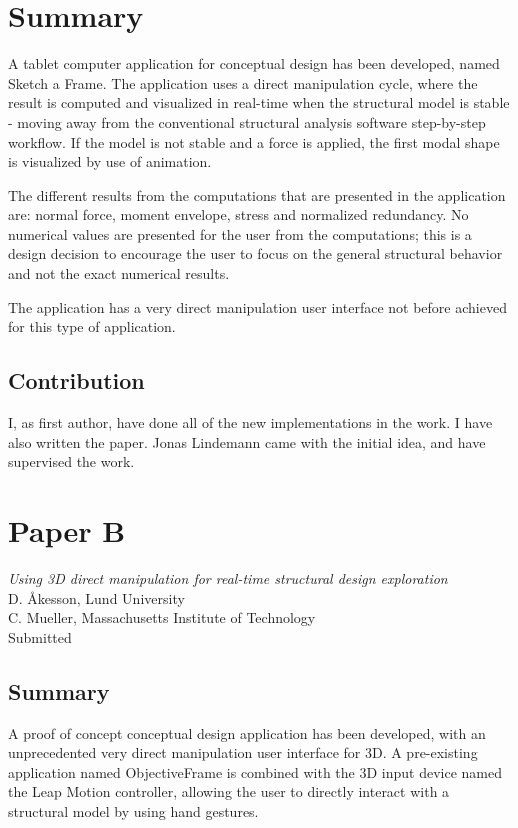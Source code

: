 \section*{Summary}

A tablet computer application for conceptual design has been developed, named Sketch a Frame. The application uses a direct manipulation cycle, where the result is computed and visualized in real-time when the structural model is stable - moving away from the conventional structural analysis software step-by-step workflow. If the model is not stable and a force is applied, the first modal shape is visualized by use of animation.

The different results from the computations that are presented in the application are: normal force, moment envelope, stress and normalized redundancy. No numerical values are presented for the user from the computations; this is a design decision to encourage the user to focus on the general structural behavior and not the exact numerical results. 

The application has a very direct manipulation user interface not before achieved for this type of application.

\subsection*{Contribution}
I, as first author, have done all of the new implementations in the work. I have also written the paper. Jonas Lindemann came with the initial idea, and have supervised the work.

\newpage
\section{Paper B}
\textit{Using 3D direct manipulation for real-time structural design exploration} \\
D. Åkesson, Lund University \\
C. Mueller, Massachusetts Institute of Technology \\
Submitted

\subsection*{Summary}

A proof of concept conceptual design application has been developed, with an unprecedented very direct manipulation user interface for 3D. A pre-existing application named ObjectiveFrame is combined with the 3D input device named the Leap Motion controller, allowing the user to directly interact with a structural model by using hand gestures.

